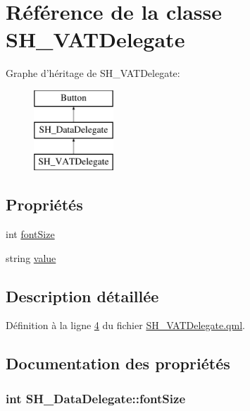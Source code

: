 \hypertarget{classSH__VATDelegate}{\section{Référence de la classe S\-H\-\_\-\-V\-A\-T\-Delegate}
\label{classSH__VATDelegate}
}
Graphe d'héritage de S\-H\-\_\-\-V\-A\-T\-Delegate\-:\begin{figure}[H]
\begin{center}
\leavevmode
\includegraphics[height=3.000000cm]{classSH__VATDelegate}
\end{center}
\end{figure}
\subsection*{Propriétés}
\begin{DoxyCompactItemize}
\item 
int \hyperlink{classSH__DataDelegate_afbb41ad9b513c7f27e7b5ad90d82e95b}{font\-Size}
\item 
string \hyperlink{classSH__DataDelegate_acb9da3c73493c88865e08d9575f26482}{value}
\end{DoxyCompactItemize}


\subsection{Description détaillée}


Définition à la ligne \hyperlink{SH__VATDelegate_8qml_source_l00004}{4} du fichier \hyperlink{SH__VATDelegate_8qml_source}{S\-H\-\_\-\-V\-A\-T\-Delegate.\-qml}.



\subsection{Documentation des propriétés}
\hypertarget{classSH__DataDelegate_afbb41ad9b513c7f27e7b5ad90d82e95b}{
\subsubsection[{font\-Size}]{\setlength{\rightskip}{0pt plus 5cm}int S\-H\-\_\-\-Data\-Delegate\-::font\-Size\hspace{0.3cm}{\ttfamily [inherited]}}}\label{classSH__DataDelegate_afbb41ad9b513c7f27e7b5ad90d82e95b}


